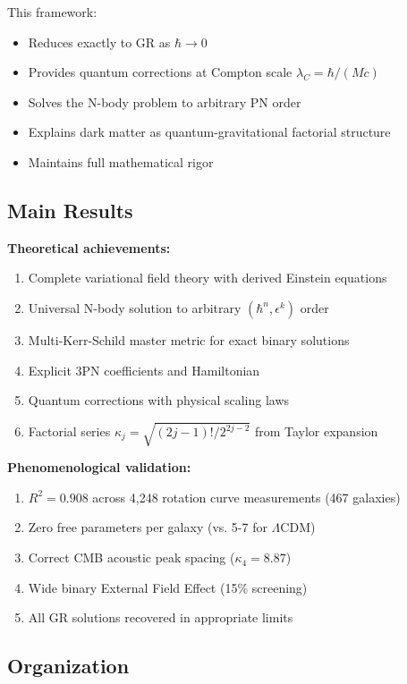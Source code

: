 \documentclass[11pt,a4paper]{article}
\theoremstyle{definition}
\theoremstyle{remark}
\begin{document}
	This framework:
	\begin{itemize}
		\item Reduces exactly to GR as $\hbar \to 0$
		\item Provides quantum corrections at Compton scale $\lambda_C = \hbar/(Mc)$
		\item Solves the N-body problem to arbitrary PN order
		\item Explains dark matter as quantum-gravitational factorial structure
		\item Maintains full mathematical rigor
	\end{itemize}
	
	\subsection{Main Results}
	
	\textbf{Theoretical achievements:}
	\begin{enumerate}
		\item Complete variational field theory with derived Einstein equations
		\item Universal N-body solution to arbitrary $(\hbar^n, \epsilon^k)$ order
		\item Multi-Kerr-Schild master metric for exact binary solutions
		\item Explicit 3PN coefficients and Hamiltonian
		\item Quantum corrections with physical scaling laws
		\item Factorial series $\kappa_j = \sqrt{(2j-1)!/2^{2j-2}}$ from Taylor expansion
	\end{enumerate}
	
	\textbf{Phenomenological validation:}
	\begin{enumerate}
		\item $R^2 = 0.908$ across 4,248 rotation curve measurements (467 galaxies)
		\item Zero free parameters per galaxy (vs. 5-7 for $\Lambda$CDM)
		\item Correct CMB acoustic peak spacing ($\kappa_4 = 8.87$)
		\item Wide binary External Field Effect (15\% screening)
		\item All GR solutions recovered in appropriate limits
	\end{enumerate}
	
	\subsection{Organization}
	
\end{document}
